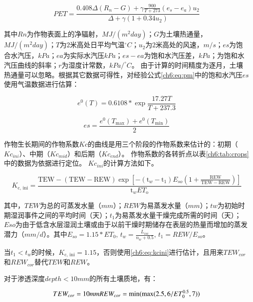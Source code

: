 \begin{equation}
    \label{ch6:eq:pm}
    PET = \frac{0.408 \Delta (R_{n}-G)+\gamma \frac{900}{T+273}
    (e_s-e_a) u_2}{\Delta+\gamma(1+0.34 u_2)}
\end{equation}

其中$Rn$为作物表面上的净辐射，$MJ/(m^2 day)$；$G$为土壤热通量，$MJ/(m^2 day)$；$T$为$2$米高处日平均气温$^\circ C$；$u_2$为$2$米高处的风速，$m/s$；$es$为饱合水汽压，$kPa$；$ea$为实际水汽压$kPa$；$es - ea$为饱和水汽压差，$kPa$；为饱和水汽压曲线的斜率；$r$为湿度计常数，$kPa/^\circ C$。
由于计算的时间精度为逐月，土壤热通量可以忽略。根据其它数据可得性，对经验公式\ref{ch6:eq:pm}中的饱和水汽压$es$使用气温数据进行估算：

\begin{equation}
    e^0(T) = 0.6108 * \exp \frac{17.27 T}{T + 237.3}
\end{equation}

\begin{equation}
    es = \frac{e^0(T_{\max}) + e^0(T_{\min})}{2}
\end{equation}

作物生长期间的作物系数$Kc$的曲线是用三个阶段的作物系数来估计的：初期（$Kc_{ini}$）、中期（$Kc_{mid}$）和后期（$Kc_{end}$）。
作物系数的各转折点以表\ref{ch6:tab:crops}中的数据为依据进行定位。
$Kc_{ini}$的计算方法如下\cite{allen1998}。

\begin{equation}
    \label{ch6:eq:kcini}
    K_{\text {c, ini}}=\frac{\mathrm{TEW}-(\mathrm{TEW}-\mathrm{REW}) \exp \left[-\left(\mathrm{t}_w-\mathrm{t}_1\right) E_{so}\left(1+\frac{\mathrm{REW}}{\mathrm{TEW}-\mathrm{REW}}\right)\right]}{\mathrm{t}_w E T_{\mathrm{o}}}
\end{equation}

其中，$TEW$为总的可蒸发水量（$mm$）；$REW$为易蒸发水量（$mm$）；$tw$为初始时期湿润事件之间的平均时间（天）；$t_1$为易蒸发水量干燥完成所需的时间（天）；$Eso$为由于低含水层湿润土壤或由于以前干燥时期储存在表层的热量而增加的蒸发潜力（$mm/d$）。其中$E_{so} = 1.15 * ET_0$, $t_w = \frac{L_{ini}}{n_w + 0.5}$, $t_1 = REW / E_{so}$。

当$t_1 < t_w$的时候，$K_{\text {c, ini}} = 1.15$，否则使用\ref{ch6:eq:kcini}进行估计，且用来$TEW_{cor}$和$REW_{cor}$替代$TEW$和$REW$。

对于渗透深度$depth < 10mm$的所有土壤质地，有：

\begin{equation}
    TEW_{cor} = 10mm \\
    REW_{cor} = \min(\max(2.5, 6 / ET_0^{0.5}, 7))
\end{equation}

